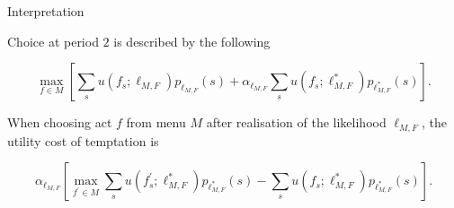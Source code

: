 \documentclass[usenames,dvipsnames,aspectratio=169,11pt, envcountsect]{beamer}
\begin{document}
\begin{frame}{Interpretation}

	Choice at period \( 2 \) is described by the following

	\vfill


	\[
		\max _{f \in M} \left[ \sum_{s} u \left( f_{s} ; \ell_{M, F} \right) p_{\ell_{M, F}} \left( s \right) +\alpha _{\ell_{M, F}} \sum_{s} u \left( f_{s} ; \ell^{*}_{M, F} \right) p_{\ell^{*}_{M, F}} \left( s \right) \right].
	\]

	\vfill \pause


	When choosing act \( f \) from menu \( M \) after realisation of the likelihood \( \ell_{M, F} \), the utility cost of temptation is

	\vfill

	\[
		\alpha _{\ell_{M, F}} \left[ \max _{f^{\prime} \in M} \sum_{s} u\left(f^{\prime}_{s} ; \ell^{*}_{M, F} \right) p_{\ell^{*}_{M, F}} \left( s \right) - \sum_{s} u \left( f_{s} ; \ell^{*}_{M, F} \right) p_{\ell^{*}_{M, F}} \left( s \right) \right] .
	\]

\end{frame}
\end{document}
